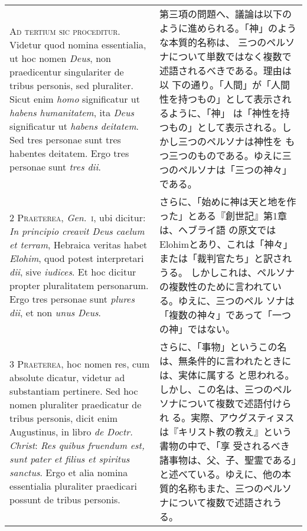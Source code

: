 \documentclass[10pt]{jsarticle} %
\begin{document}
\begin{longtable}{p{21em}p{21em}}



{\Huge A}{\scshape d tertium sic proceditur}. Videtur quod nomina essentialia, ut hoc nomen
{\itshape Deus}, non praedicentur singulariter de tribus personis, sed
pluraliter. Sicut enim {\itshape homo} significatur ut {\itshape habens humanitatem}, ita {\itshape Deus}
significatur ut {\itshape habens deitatem}. Sed tres personae sunt tres habentes
deitatem. Ergo tres personae sunt {\itshape tres dii}.


&

第三項の問題へ、議論は以下のように進められる。「神」のような本質的名称は、
 三つのペルソナについて単数ではなく複数で述語されるべきである。理由は以
 下の通り。「人間」が「人間性を持つもの」として表示されるように、「神」
 は「神性を持つもの」として表示される。しかし三つのペルソナは神性を
 もつ三つのものである。ゆえに三つのペルソナは「三つの神々」である。


\\



2 {\scshape Praeterea}, {\itshape Gen}.~{\scshape i}, ubi dicitur: {\itshape In principio creavit Deus caelum et
terram}, Hebraica veritas habet {\itshape Elohim}, quod potest interpretari {\itshape dii},
sive {\itshape iudices}. Et hoc dicitur propter pluralitatem personarum. Ergo tres
personae sunt {\itshape plures dii}, et non {\itshape unus Deus}.


&

さらに、「始めに神は天と地を作った」とある『創世記』第1章は、ヘブライ語
 の原文ではElohimとあり、これは「神々」または「裁判官たち」と訳されうる。
 しかしこれは、ペルソナの複数性のために言われている。ゆえに、三つのペル
 ソナは「複数の神々」であって「一つの神」ではない。


\\



3 {\scshape Praeterea}, hoc nomen res, cum absolute dicatur, videtur ad substantiam
pertinere. Sed hoc nomen pluraliter praedicatur de tribus personis,
dicit enim Augustinus, in libro {\itshape de Doctr. Christ}: {\itshape Res quibus fruendum
est, sunt pater et filius et spiritus sanctus}. Ergo et alia nomina
essentialia pluraliter praedicari possunt de tribus personis.


&

さらに、「事物」というこの名は、無条件的に言われたときには、実体に属する
 と思われる。しかし、この名は、三つのペルソナについて複数で述語付けられ
 る。実際、アウグスティヌスは『キリスト教の教え』という書物の中で、「享
 受されるべき諸事物は、父、子、聖霊である」と述べている。ゆえに、他の本
 質的名称もまた、三つのペルソナについて複数で述語されうる。



\end{longtable}
\end{document}
